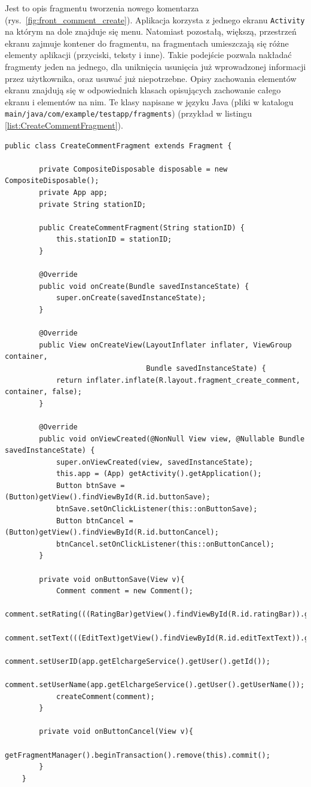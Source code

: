 Jest to opis fragmentu tworzenia nowego komentarza (rys.~\ref{fig:front_comment_create}). Aplikacja korzysta z jednego ekranu \texttt{Activity} na którym na dole znajduje się menu. Natomiast pozostałą, większą, przestrzeń ekranu zajmuje kontener do fragmentu, na fragmentach umieszczają się różne elementy aplikacji (przyciski, teksty i inne).
Takie podejście pozwala nakładać fragmenty jeden na jednego, dla uniknięcia usunięcia już wprowadzonej informacji przez użytkownika, oraz usuwać już niepotrzebne. Opisy zachowania elementów ekranu znajdują się w odpowiednich klasach opisujących zachowanie całego ekranu i elementów na nim. Te klasy napisane w języku Java (pliki w katalogu \texttt{main/java/com/example/testapp/fragments}) (przykład w listingu \ref{list:CreateCommentFragment}).

\begin{lstlisting}[label=list:CreateCommentFragment,caption=Klasa opisująca zachowanie elementów na fragemencie tworzenia komentarza,basicstyle=\tiny\ttfamily]
    public class CreateCommentFragment extends Fragment {

        private CompositeDisposable disposable = new CompositeDisposable();
        private App app;
        private String stationID;
    
        public CreateCommentFragment(String stationID) {
            this.stationID = stationID;
        }
    
        @Override
        public void onCreate(Bundle savedInstanceState) {
            super.onCreate(savedInstanceState);
        }
    
        @Override
        public View onCreateView(LayoutInflater inflater, ViewGroup container,
                                 Bundle savedInstanceState) {
            return inflater.inflate(R.layout.fragment_create_comment, container, false);
        }
    
        @Override
        public void onViewCreated(@NonNull View view, @Nullable Bundle savedInstanceState) {
            super.onViewCreated(view, savedInstanceState);
            this.app = (App) getActivity().getApplication();
            Button btnSave = (Button)getView().findViewById(R.id.buttonSave);
            btnSave.setOnClickListener(this::onButtonSave);
            Button btnCancel = (Button)getView().findViewById(R.id.buttonCancel);
            btnCancel.setOnClickListener(this::onButtonCancel);
        }
    
        private void onButtonSave(View v){
            Comment comment = new Comment();
            comment.setRating(((RatingBar)getView().findViewById(R.id.ratingBar)).getRating());
            comment.setText(((EditText)getView().findViewById(R.id.editTextText)).getText().toString());
            comment.setUserID(app.getElchargeService().getUser().getId());
            comment.setUserName(app.getElchargeService().getUser().getUserName());
            createComment(comment);
        }
    
        private void onButtonCancel(View v){
            getFragmentManager().beginTransaction().remove(this).commit();
        }
    }
\end{lstlisting}


